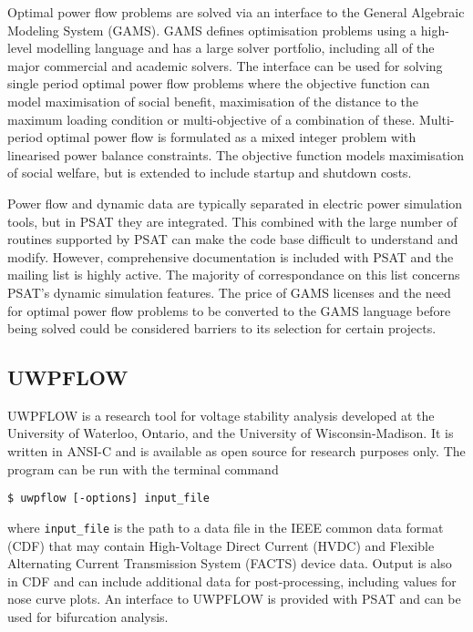 
Optimal power flow problems are solved via an interface to the General
Algebraic Modeling System (GAMS).  GAMS defines optimisation
problems using a high-level modelling language and has a large solver portfolio, including all
of the major commercial and academic solvers.  The interface can be used for
solving single period optimal power flow problems where the objective function
can model maximisation of social benefit, maximisation of the distance to
the maximum loading condition or multi-objective of a combination of these.
Multi-period optimal power flow is formulated as a mixed integer problem with
linearised power balance constraints.  The objective function models
maximisation of social welfare, but is extended to include startup and
shutdown costs.

Power flow and dynamic data are typically separated in electric power
simulation tools, but in PSAT they are integrated.  This combined with the
large number of routines supported by PSAT can make the code base difficult to
understand and modify.  However, comprehensive documentation is included with
PSAT and the mailing list is highly active.  The majority of correspondance on
this list concerns PSAT's dynamic simulation features.  The price of GAMS
licenses and the need for optimal power flow problems to be converted to the
GAMS language before being solved could be considered barriers to its
selection for certain projects.

\subsection{UWPFLOW}
UWPFLOW is a research tool for voltage stability analysis developed at the
University of Waterloo, Ontario, and the University of Wisconsin-Madison.  It
is written in ANSI-C and is available as open source for research purposes
only. The program can be run with the terminal command
\begin{center}
\begin{verbatim}
$ uwpflow [-options] input_file
\end{verbatim}
\end{center}
where \texttt{input\_file} is the path to a data file in the IEEE common data
format (CDF) \cite{cdf:73} that may contain High-Voltage Direct Current (HVDC)
and Flexible Alternating Current Transmission System (FACTS) device data.
Output is also in CDF and can include additional data for post-processing,
including values for nose curve plots.  An interface to UWPFLOW is provided
with PSAT and can be used for bifurcation analysis.

